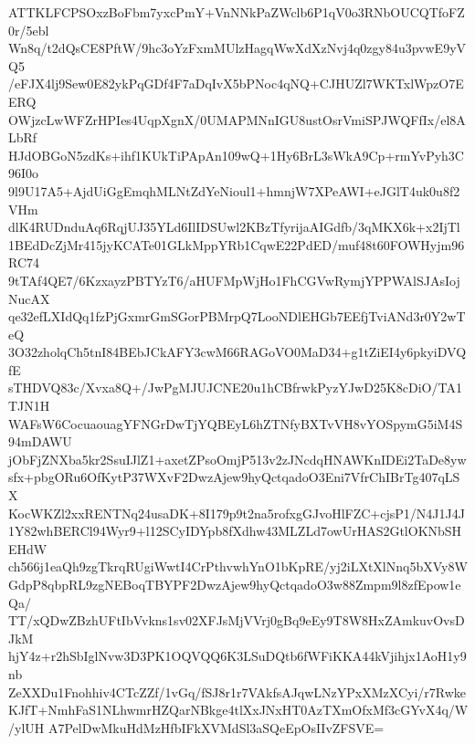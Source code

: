 ATTKLFCPSOxzBoFbm7yxcPmY+VnNNkPaZWclb6P1qV0o3RNbOUCQTfoFZ0r/5ebl
Wn8q/t2dQsCE8PftW/9hc3oYzFxmMUlzHagqWwXdXzNvj4q0zgy84u3pvwE9yVQ5
/eFJX4lj9Sew0E82ykPqGDf4F7aDqIvX5bPNoc4qNQ+CJHUZl7WKTxlWpzO7EERQ
OWjzcLwWFZrHPIes4UqpXgnX/0UMAPMNnIGU8ustOsrVmiSPJWQFfIx/el8ALbRf
HJdOBGoN5zdKs+ihf1KUkTiPApAn109wQ+1Hy6BrL3sWkA9Cp+rmYvPyh3C96I0o
9l9U17A5+AjdUiGgEmqhMLNtZdYeNioul1+hmnjW7XPeAWI+eJGlT4uk0u8f2VHm
dlK4RUDnduAq6RqjUJ35YLd6IlIDSUwl2KBzTfyrijaAIGdfb/3qMKX6k+x2IjTl
1BEdDcZjMr415jyKCATe01GLkMppYRb1CqwE22PdED/muf48t60FOWHyjm96RC74
9tTAf4QE7/6KzxayzPBTYzT6/aHUFMpWjHo1FhCGVwRymjYPPWAlSJAsIojNucAX
qe32efLXIdQq1fzPjGxmrGmSGorPBMrpQ7LooNDlEHGb7EEfjTviANd3r0Y2wTeQ
3O32zholqCh5tnI84BEbJCkAFY3cwM66RAGoVO0MaD34+g1tZiEI4y6pkyiDVQfE
sTHDVQ83c/Xvxa8Q+/JwPgMJUJCNE20u1hCBfrwkPyzYJwD25K8cDiO/TA1TJN1H
WAFsW6CocuaouagYFNGrDwTjYQBEyL6hZTNfyBXTvVH8vYOSpymG5iM4S94mDAWU
jObFjZNXba5kr2SsuIJlZ1+axetZPsoOmjP513v2zJNcdqHNAWKnIDEi2TaDe8yw
sfx+pbgORu6OfKytP37WXvF2DwzAjew9hyQctqadoO3Eni7VfrChIBrTg407qLSX
KocWKZl2xxRENTNq24usaDK+8I179p9t2na5rofxgGJvoHlFZC+cjsP1/N4J1J4J
1Y82whBERCl94Wyr9+l12SCyIDYpb8fXdhw43MLZLd7owUrHAS2GtlOKNbSHEHdW
ch566j1eaQh9zgTkrqRUgiWwtI4CrPthvwhYnO1bKpRE/yj2iLXtXlNnq5bXVy8W
GdpP8qbpRL9zgNEBoqTBYPF2DwzAjew9hyQctqadoO3w88Zmpm9l8zfEpow1eQa/
TT/xQDwZBzhUFtIbVvkns1sv02XFJsMjVVrj0gBq9eEy9T8W8HxZAmkuvOvsDJkM
hjY4z+r2hSbIglNvw3D3PK1OQVQQ6K3LSuDQtb6fWFiKKA44kVjihjx1AoH1y9nb
ZeXXDu1Fnohhiv4CTcZZf/1vGq/fSJ8r1r7VAkfsAJqwLNzYPxXMzXCyi/r7Rwke
KJfT+NmhFaS1NLhwmrHZQarNBkge4tlXxJNxHT0AzTXmOfxMf3cGYvX4q/W/ylUH
A7PelDwMkuHdMzHfbIFkXVMdSl3aSQeEpOsIIvZFSVE=
